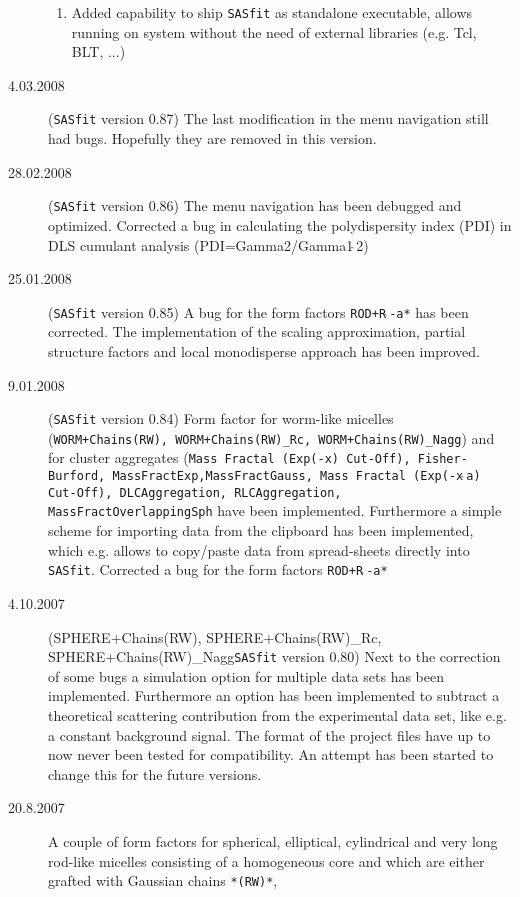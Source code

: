 \begin{description}
\begin{enumerate}
        \item Added capability to ship {\tt SASfit} as standalone executable, allows running on system without the
                need of external libraries (e.g. Tcl, BLT, ...)
    \end{enumerate}
    \item[4.03.2008] ({\tt SASfit} version 0.87) The last
    modification in the menu navigation still had bugs. Hopefully
    they are removed in this version.
    \item[28.02.2008] ({\tt SASfit} version 0.86)
    The menu navigation has been debugged and optimized.
    Corrected a bug in calculating the polydispersity index (PDI)
    in DLS cumulant analysis (PDI=Gamma2/Gamma1$\hat{~}$2)
    \item[25.01.2008] ({\tt SASfit} version 0.85)
    A bug for the form factors  \texttt{ROD+R$\hat{~}$-a*} has
    been corrected. The implementation of the scaling
    approximation, partial structure factors and local monodisperse
    approach has been improved.
    \item[9.01.2008] ({\tt SASfit} version 0.84) Form factor for
    worm-like micelles (\texttt{WORM+Chains(RW), WORM+Chains(RW)\_Rc,
    WORM+Chains(RW)\_Nagg}) and for cluster aggregates
    (\texttt{Mass Fractal (Exp(-x) Cut-Off), Fisher-Burford,
    MassFractExp,MassFractGauss, Mass Fractal (Exp(-x$\hat{~}$a) Cut-Off), DLCAggregation,
    RLCAggregation, MassFractOverlappingSph} have been implemented. Furthermore a simple scheme for importing data
    from the clipboard has been implemented, which e.g. allows to copy/paste
    data from spread-sheets directly into {\tt SASfit}.
    Corrected a bug for the form factors  \texttt{ROD+R$\hat{~}$-a*}
    \item[4.10.2007] ({SPHERE+Chains(RW), SPHERE+Chains(RW)\_Rc, SPHERE+Chains(RW)\_Nagg\tt SASfit} version 0.80)
    Next to the correction of some bugs a simulation option for
    multiple data sets has been implemented. Furthermore an option has been implemented to subtract a
    theoretical scattering contribution from the experimental data set, like e.g. a constant background signal.
    The format of the project files have up to now never been tested for compatibility. An attempt has
    been started to change this for the future versions.
    \item[20.8.2007] A couple of form factors for spherical, elliptical, cylindrical and very long rod-like
    micelles consisting of a homogeneous core and which are either grafted with Gaussian chains \texttt{*(RW)*},

\end{description}

